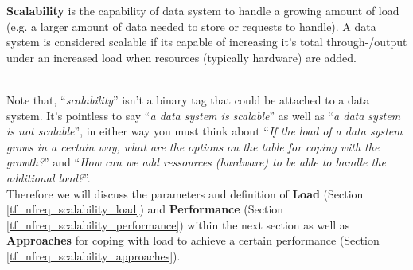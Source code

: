\hspace*{4mm}%
\begin{minipage}{0.8\textwidth}\raggedright
\textbf{Scalability} is the capability of data system to handle a growing amount of load (e.g. a larger amount of data needed to store or requests to handle). A data system is considered scalable if its capable of increasing it's total through-/output under an increased load when resources (typically hardware) are added. \\
\end{minipage}\\[0.4 cm]

Note that, ``\textit{scalability}'' isn't a binary tag that could be attached to a data system. It's pointless to say ``\textit{a data system is scalable}'' as well as ``\textit{a data system is not scalable}'', in either way you must think about ``\textit{If the load of a data system grows in a certain way, what are the options on the table for coping with the growth?}'' and ``\textit{How can we add ressources (hardware) to be able to handle the additional load?}''. \\
Therefore we will discuss the parameters and definition of \textbf{Load} (Section \ref{tf_nfreq_scalability_load}) and \textbf{Performance} (Section \ref{tf_nfreq_scalability_performance}) within the next section as well as \textbf{Approaches} for coping with load to achieve a certain performance (Section \ref{tf_nfreq_scalability_approaches}).

